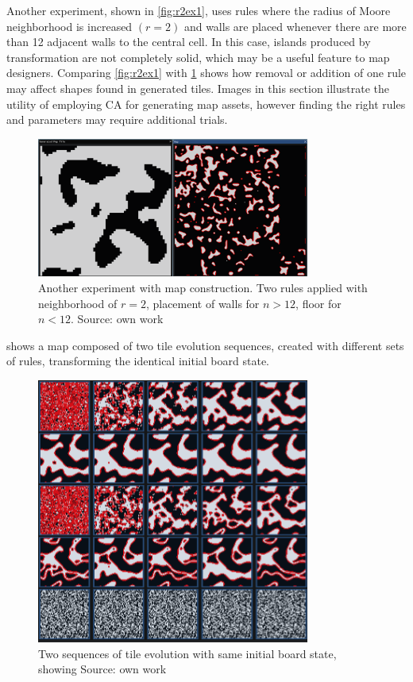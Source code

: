 \documentclass[12pt]{report}
\begin{document}
Another experiment, shown in \cref{fig:r2ex1}, uses rules where the radius of Moore neighborhood is increased $(r = 2)$ and walls are placed whenever there are more than 12 adjacent walls to the central cell. In this case, islands produced by transformation are not completely solid, which may be a useful feature to map designers. Comparing \cref{fig:r2ex1} with \cref{fig:ex3rst2} shows how removal or addition of one rule may affect shapes found in generated tiles. Images in this section illustrate the utility of employing CA for generating map assets, however finding the right rules and parameters may require additional trials.

\begin{figure}[h]
	\centering
	\includegraphics[width=0.8\textwidth]{images/ex3rst2}
	\caption{Another experiment with map construction. Two rules applied with neighborhood of $r = 2$, placement of walls for $n > 12$, floor for $n < 12$. Source: own work}
	\label{fig:ex3rst2}
\end{figure}

 shows a map composed of two tile evolution sequences, created with different sets of rules, transforming the identical initial board state.

\begin{figure}[h]
	\centering
	\includegraphics[width=0.8\textwidth]{images/ex2sequences}
	\caption{Two sequences of tile evolution with same initial board state, showing  Source: own work}
	\label{fig:seqr2r3}
\end{figure}
\end{document}
